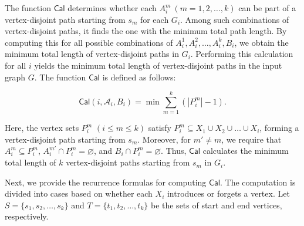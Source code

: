 \documentclass[runningheads]{llncs}
\theoremstyle{plain}
\theoremstyle{definition}
\begin{document}
The function $\mathsf{Cal}$ determines whether each $A^m_i\ (m=1, 2, \dots, k)$ can be part of a vertex-disjoint path starting from $s_m$ for each $G_i$. Among such combinations of vertex-disjoint paths, it finds the one with the minimum total path length. By computing this for all possible combinations of $A^1_i, A^2_i, \dots, A^k_i, B_i$, we obtain the minimum total length of vertex-disjoint paths in $G_i$. Performing this calculation for all $i$ yields the minimum total length of vertex-disjoint paths in the input graph $G$. The function $\mathsf{Cal}$ is defined as follows:

\begin{equation}\label{def_cal}
    \mathsf{Cal}(i, \mathscr{A}_i, B_i) = \min \sum_{m=1}^k (|P^m_i| - 1).
\end{equation}

Here, the vertex sets $P^m_i$ $(i \leq m \leq k)$ satisfy $P^m_i \subseteq X_1 \cup X_2 \cup \dots \cup X_i$, forming a vertex-disjoint path starting from $s_m$. Moreover, for $m' \neq m$, we require that $A^m_i \subseteq P^m_i$, $A^{m'}_i \cap P^m_i = \varnothing$, and $B_i \cap P^m_i = \varnothing$. Thus, $\mathsf{Cal}$ calculates the minimum total length of $k$ vertex-disjoint paths starting from $s_m$ in $G_i$.

Next, we provide the recurrence formulas for computing $\mathsf{Cal}$. The computation is divided into cases based on whether each $X_i$ introduces or forgets a vertex. Let $S = \{s_1, s_2, \dots, s_k\}$ and $T = \{t_1, t_2, \dots, t_k\}$ be the sets of start and end vertices, respectively.
\end{document}
